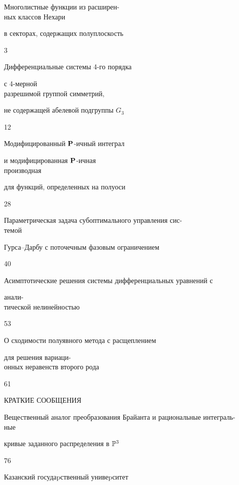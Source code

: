 \bigskip












{Многолистные функции из расширен-\\ ных классов Нехари


в секторах, содержащих полуплоскость}{3}




{Дифференциальные системы 4-го порядка


с 4-мерной\\ разрешимой группой симметрий,


не содержащей абелевой подгруппы $G_3$}{12}




{Модифицированный ${\bold P}$-ичный интеграл


и модифицированная ${\bold P}$-ичная\\ производная


для функций, определенных на полуоси}{28}




{Параметрическая задача субоптимального управления сис-\\ темой


Гурса--Дарбу с поточечным фазовым ограничением}{40}




{Асимптотические решения системы дифференциальных уравнений с


анали-\\ тической нелинейностью}{53}




{О сходимости полуявного метода с расщеплением


для решения вариаци-\\ онных неравенств второго рода}{61}










\bigskip


\begin{center}


КРАТКИЕ СООБЩЕНИЯ


\end{center}


\bigskip







{Вещественный аналог преобразования Брайанта и рациональные интеграль-\\ ные 


кривые заданного распределения в $\Bbb{P}^3$}{76}











\vfill


\noindent\raisebox{2pt}{\copyright} Казанский госудаpственный унивеpситет





